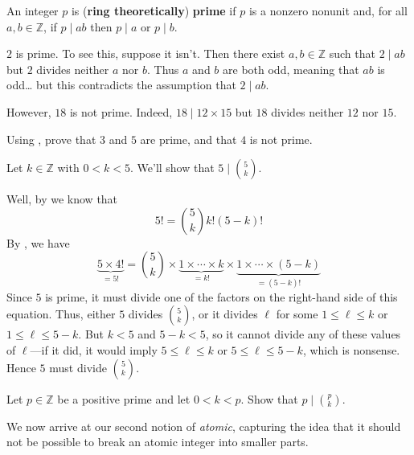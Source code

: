 \begin{definition}
\label{defPrime}
An integer $p$ is (\textbf{ring theoretically}) \textbf{prime} if $p$ is a nonzero nonunit and, for all $a,b \in \mathbb{Z}$, if $p \mid ab$ then $p \mid a$ or $p \mid b$.
\end{definition}

\begin{example}
$2$ is prime. To see this, suppose it isn't. Then there exist $a,b \in \mathbb{Z}$ such that $2 \mid ab$ but $2$ divides neither $a$ nor $b$. Thus $a$ and $b$ are both odd, meaning that $ab$ is odd\dots{} but this contradicts the assumption that $2 \mid ab$.

However, $18$ is not prime. Indeed, $18 \mid 12 \times 15$ but $18$ divides neither $12$ nor $15$.
\end{example}

\begin{exercise}
Using , prove that $3$ and $5$ are prime, and that $4$ is not prime.
\end{exercise}

\begin{example}
Let $k \in \mathbb{Z}$ with $0<k<5$. We'll show that $5 \mid \binom{5}{k}$.

Well, by  we know that
\[ 5! = \binom{5}{k}k!(5-k)! \]
By , we have
\[ \underbrace{5 \times 4!}_{=5!} = \binom{5}{k} \times \underbrace{1 \times \cdots \times k}_{=k!} \times \underbrace{1 \times \cdots \times (5-k)}_{=(5-k)!} \]
Since $5$ is prime, it must divide one of the factors on the right-hand side of this equation. Thus, either $5$ divides $\binom{5}{k}$, or it divides $\ell$ for some $1 \le \ell \le k$ or $1 \le \ell \le 5-k$. But $k<5$ and $5-k<5$, so it cannot divide any of these values of $\ell$---if it did, it would imply $5 \le \ell \le k$ or $5 \le \ell \le 5-k$, which is nonsense. Hence $5$ must divide $\binom{5}{k}$.
\end{example}

\begin{exercise}
Let $p \in \mathbb{Z}$ be a positive prime and let $0 < k < p$. Show that $p \mid \binom{p}{k}$.
\end{exercise}

We now arrive at our second notion of \textit{atomic}, capturing the idea that it should not be possible to break an atomic integer into smaller parts.

